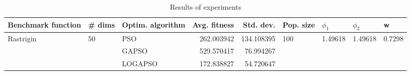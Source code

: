 \begin{table}
\centering
\caption{Results of experiments}
\begin{tabular}{lllrrllll}
\toprule
        Benchmark function &             \# dims & Optim. algorithm &  Avg. fitness &  Std. dev. &            Pop. size &               $\phi_{1}$ &               $\phi_{2}$ &                       w \\
\midrule
\multirow{3}{*}{Rastrigin} & \multirow{3}{*}{50} &              PSO &    262.003942 & 134.108395 & \multirow{3}{*}{100} & \multirow{3}{*}{1.49618} & \multirow{3}{*}{1.49618} & \multirow{3}{*}{0.7298} \\
                           &                     &            GAPSO &    529.570417 &  76.994267 &                      &                          &                          &                         \\
                           &                     &          LOGAPSO &    172.838827 &  54.720647 &                      &                          &                          &                         \\
\bottomrule
\end{tabular}
\end{table}
